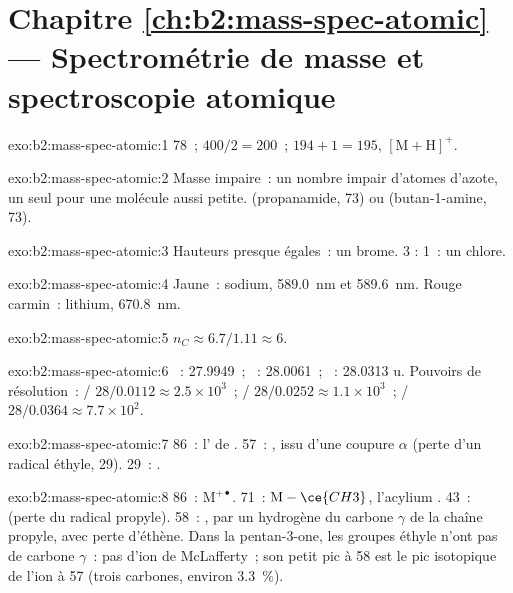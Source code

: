 \section*{Chapitre \ref{ch:b2:mass-spec-atomic} --- Spectrométrie de masse et spectroscopie atomique}

\begin{solution}{exo:b2:mass-spec-atomic:1}
78~; $400/2 = 200$~; $194 + 1 = 195$, $[\mathrm M + \mathrm H]^+$.
\end{solution}

\begin{solution}{exo:b2:mass-spec-atomic:2}
Masse impaire~: un nombre impair d'atomes d'azote, un seul pour une molécule aussi petite. 
(propanamide, 73) ou  (butan-1-amine, 73).
\end{solution}

\begin{solution}{exo:b2:mass-spec-atomic:3}
Hauteurs presque égales~: un brome. 3 : 1~: un chlore.
\end{solution}

\begin{solution}{exo:b2:mass-spec-atomic:4}
Jaune~: sodium, \qty{589.0}{nm} et \qty{589.6}{nm}. Rouge carmin~: lithium, \qty{670.8}{nm}.
\end{solution}

\begin{solution}{exo:b2:mass-spec-atomic:5}
$n_C \approx 6.7/1.11 \approx 6$.
\end{solution}

\begin{solution}{exo:b2:mass-spec-atomic:6}
~: 27.9949~; ~: 28.0061~; ~: 28.0313 u. Pouvoirs de résolution~: / $28/0.0112
\approx 2.5 \times 10^3$~; / $28/0.0252 \approx 1.1 \times 10^3$~; /
$28/0.0364 \approx 7.7 \times 10^2$.
\end{solution}

\begin{solution}{exo:b2:mass-spec-atomic:7}
86~: l' de . 57~: ,  issu d'une coupure $\alpha$ (perte
d'un radical éthyle, 29). 29~: .
\end{solution}

\begin{solution}{exo:b2:mass-spec-atomic:8}
86~: $\mathrm M^{+\bullet}$. 71~: $\mathrm M - \ce{CH3}$, l'acylium . 43~: 
(perte du radical propyle). 58~: , par un hydrogène du carbone $\gamma$ de la
chaîne propyle,
avec perte d'éthène. Dans la pentan-3-one, les groupes éthyle n'ont pas de carbone $\gamma$~: pas d'ion
de McLafferty~; son petit pic à 58 est le pic isotopique  de l'ion à 57 (trois carbones,
environ 3.3~\%).
\end{solution}

